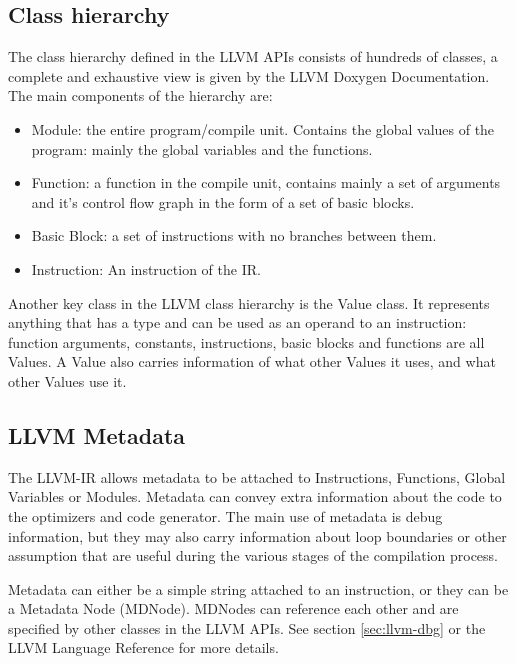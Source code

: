 \subsection{Class hierarchy}
The class hierarchy defined in the LLVM APIs consists of hundreds of classes, a complete and exhaustive view is given by the LLVM Doxygen Documentation. The main components of the hierarchy are:
\begin{itemize}
\item Module: the entire program/compile unit. Contains the global values of the program: mainly the global variables and the functions.
\item Function: a function in the compile unit, contains mainly a set of arguments and it's control flow graph in the form of a set of basic blocks.
\item Basic Block: a set of instructions with no branches between them.
\item Instruction: An instruction of the IR.
\end{itemize}
Another key class in the LLVM class hierarchy is the Value class. It represents anything that has a type and can be used as an operand to an instruction: function arguments, constants, instructions, basic blocks and functions are all Values.
A Value also carries information of what other Values it uses, and what other Values use it.

\subsection{LLVM Metadata}
The LLVM-IR allows metadata to be attached to Instructions, Functions, Global Variables or  Modules. Metadata can convey extra information about the code to the optimizers and code generator.
The main use of metadata is debug information, but they may also carry information about loop boundaries or other assumption that are useful during the various stages of the compilation process. \par
Metadata can either be a simple string attached to an instruction, or they can be a Metadata Node (MDNode). MDNodes can reference each other and are specified by other classes in the LLVM APIs. See section \ref{sec:llvm-dbg} or the LLVM Language Reference \cite{llvm-langref} for more details.

